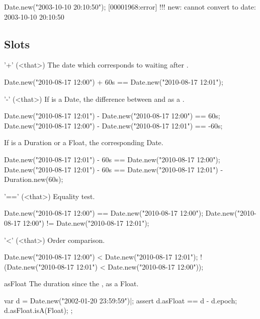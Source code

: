 \begin{urbiscript}
Date.new("2003-10-10  20:10:50");
[00001968:error] !!! new: cannot convert to date: 2003-10-10  20:10:50
\end{urbiscript}

\subsection{Slots}

\begin{urbiscriptapi}
\item['+'](<that>)%
  The date which corresponds to waiting  
  after \this.
\begin{urbiassert}
Date.new("2010-08-17 12:00") + 60s == Date.new("2010-08-17 12:01");
\end{urbiassert}

\item['-'](<that>)%
  If  is a Date, the difference between \this and  as a
  .
\begin{urbiassert}
Date.new("2010-08-17 12:01") - Date.new("2010-08-17 12:00") ==  60s;
Date.new("2010-08-17 12:00") - Date.new("2010-08-17 12:01") == -60s;
\end{urbiassert}

If  is a Duration or a Float, the corresponding Date.

\begin{urbiassert}
Date.new("2010-08-17 12:01") - 60s == Date.new("2010-08-17 12:00");
Date.new("2010-08-17 12:01") - 60s
  == Date.new("2010-08-17 12:01") - Duration.new(60s);
\end{urbiassert}

\item['=='](<that>)%
  Equality test.
\begin{urbiassert}
Date.new("2010-08-17 12:00") == Date.new("2010-08-17 12:00");
Date.new("2010-08-17 12:00") != Date.new("2010-08-17 12:01");
\end{urbiassert}

\item['<'](<that>)%
  Order comparison.
\begin{urbiassert}
   Date.new("2010-08-17 12:00") < Date.new("2010-08-17 12:01");
! (Date.new("2010-08-17 12:01") < Date.new("2010-08-17 12:00"));
\end{urbiassert}

\item[asFloat] The duration since the , as a Float.
\begin{urbiscript}
var d = Date.new("2002-01-20 23:59:59")|;
assert
{
  d.asFloat == d - d.epoch;
  d.asFloat.isA(Float);
};
\end{urbiscript}


\end{urbiscriptapi}

